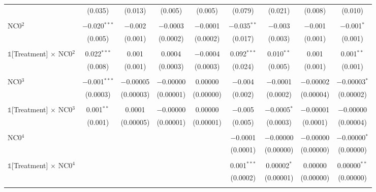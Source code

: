 {\begin{table}[t!]
\begin{adjustbox}{scale = 0.83}
\begin{threeparttable}
\begin{tabular}{@{\extracolsep{1pt}}lcccccccc}
                    & (0.035) & (0.013) & (0.005) & (0.005) & (0.079) & (0.021) & (0.008) & (0.010) \\ 
                    & & & & & & & & \\ 
                    NC0$^{2}$ & $-$0.020$^{***}$ & $-$0.002 & $-$0.0003 & $-$0.0001 & $-$0.035$^{**}$ & $-$0.003 & $-$0.001 & $-$0.001$^{*}$ \\ 
                    & (0.005) & (0.001) & (0.0002) & (0.0002) & (0.017) & (0.003) & (0.001) & (0.001) \\ 
                    & & & & & & & & \\ 
                    $\mathbb{1}$[Treatment] $\times$ NC0$^{2}$ & 0.022$^{***}$ & 0.001 & 0.0004 & $-$0.0004 & 0.092$^{***}$ & 0.010$^{**}$ & 0.001 & 0.001$^{**}$ \\ 
                    & (0.008) & (0.001) & (0.0003) & (0.0003) & (0.024) & (0.005) & (0.001) & (0.001) \\ 
                    & & & & & & & & \\ 
                    NC0$^{3}$ & $-$0.001$^{***}$ & $-$0.00005 & $-$0.00000 & 0.00000 & $-$0.004 & $-$0.0001 & $-$0.00002 & $-$0.00003$^{*}$ \\ 
                    & (0.0003) & (0.00003) & (0.00001) & (0.00000) & (0.002) & (0.0002) & (0.00004) & (0.00002) \\ 
                    & & & & & & & & \\ 
                    $\mathbb{1}$[Treatment] $\times$ NC0$^{3}$ & 0.001$^{**}$ & 0.0001 & $-$0.00000 & 0.00000 & $-$0.005 & $-$0.0005$^{*}$ & $-$0.00001 & $-$0.00000 \\ 
                    & (0.001) & (0.00005) & (0.00001) & (0.00001) & (0.005) & (0.0003) & (0.0001) & (0.00004) \\ 
                    & & & & & & & & \\ 
                    NC0$^{4}$ &  &  &  &  & $-$0.0001 & $-$0.00000 & $-$0.00000 & $-$0.00000$^{*}$ \\ 
                    &  &  &  &  & (0.0001) & (0.00000) & (0.00000) & (0.00000) \\ 
                    & & & & & & & & \\ 
                    $\mathbb{1}$[Treatment] $\times$ NC0$^{4}$ &  &  &  &  & 0.001$^{***}$ & 0.00002$^{*}$ & 0.00000 & 0.00000$^{**}$ \\ 
                    &  &  &  &  & (0.0002) & (0.00001) & (0.00000) & (0.00000) \\ 
                    & & & & & & & & \\ 

\end{tabular}
\end{threeparttable}
\end{adjustbox}
\end{table}}
